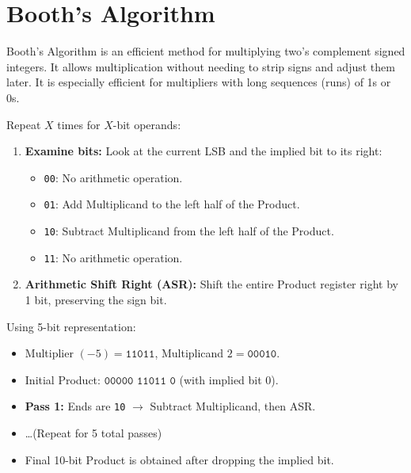 \section{Booth's Algorithm}

\begin{theorem}
Booth's Algorithm is an efficient method for multiplying two's complement signed integers. It allows multiplication without needing to strip signs and adjust them later. It is especially efficient for multipliers with long sequences (runs) of 1s or 0s.
\end{theorem}

\medskip

\begin{proposition}
Repeat $X$ times for $X$-bit operands:

\begin{enumerate}
    \item \textbf{Examine bits:} Look at the current LSB and the implied bit to its right:

    \begin{itemize}
        \item \texttt{00}: No arithmetic operation.
        \item \texttt{01}: Add Multiplicand to the left half of the Product.
        \item \texttt{10}: Subtract Multiplicand from the left half of the Product.
        \item \texttt{11}: No arithmetic operation.
    \end{itemize}

    \item \textbf{Arithmetic Shift Right (ASR):} Shift the entire Product register right by 1 bit, preserving the sign bit.
\end{enumerate}

\end{proposition}

\medskip

\begin{example}
Using 5-bit representation:

\begin{itemize}
    \item Multiplier $(-5) = \texttt{11011}$, Multiplicand $2 = \texttt{00010}$.
    \item Initial Product: $\texttt{00000 11011 0}$ (with implied bit 0).
    \item \textbf{Pass 1:} Ends are \texttt{10} $\rightarrow$ Subtract Multiplicand, then ASR.
    \item \dots (Repeat for 5 total passes)
    \item Final 10-bit Product is obtained after dropping the implied bit.
\end{itemize}

\end{example}

